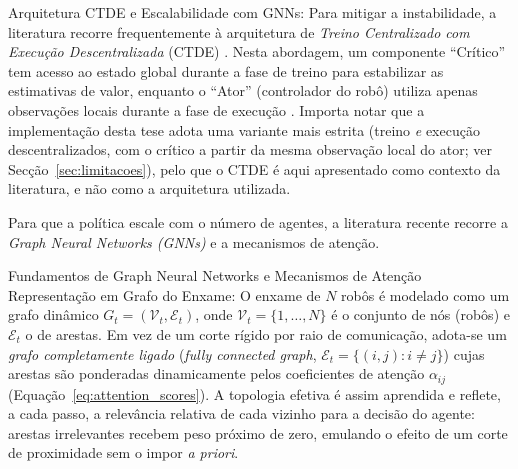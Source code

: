 \documentclass[12pt,reqno, twoside]{amsbook}
\makeatletter
\def\subsection{\@startsection{subsection}{2}%
      \z@{.5\linespacing\@plus.7\linespacing}{.25\linespacing}%
      {\normalfont\bfseries\flushleft}}
\def\paragraph{\@startsection{paragraph}{4}%
  \z@\z@{-\fontdimen2\font}%
  {\normalfont\bfseries}}
\theoremstyle{plain}
\numberwithin{equation}{chapter}
\numberwithin{section}{chapter}
\numberwithin{table}{chapter}
\numberwithin{figure}{chapter}
\makeatother
\begin{document}
\paragraph{Arquitetura CTDE e Escalabilidade com GNNs:} Para mitigar a instabilidade, a literatura recorre frequentemente à arquitetura de \emph{Treino Centralizado com Execução Descentralizada} (CTDE) \cite{lowe2017maddpg}. Nesta abordagem, um componente ``Crítico'' tem acesso ao estado global durante a fase de treino para estabilizar as estimativas de valor, enquanto o ``Ator'' (controlador do robô) utiliza apenas observações locais durante a fase de execução \cite{chen2024graph}. Importa notar que a implementação desta tese adota uma variante mais estrita (treino \emph{e} execução descentralizados, com o crítico a partir da mesma observação local do ator; ver Secção~\ref{sec:limitacoes}), pelo que o CTDE é aqui apresentado como contexto da literatura, e não como a arquitetura utilizada.

Para que a política escale com o número de agentes, a literatura recente recorre a \emph{Graph Neural Networks (GNNs)} e a mecanismos de atenção.

\subsection{Fundamentos de Graph Neural Networks e Mecanismos de Atenção}
\paragraph{Representação em Grafo do Enxame:}
O enxame de $N$ robôs é modelado como um grafo dinâmico $G_t = (\mathcal{V}_t, \mathcal{E}_t)$, onde $\mathcal{V}_t = \{1,\ldots,N\}$ é o conjunto de nós (robôs) e $\mathcal{E}_t$ o de arestas. Em vez de um corte rígido por raio de comunicação, adota-se um \emph{grafo completamente ligado} (\textit{fully connected graph}, $\mathcal{E}_t = \{(i,j) : i \neq j\}$) cujas arestas são ponderadas dinamicamente pelos coeficientes de atenção $\alpha_{ij}$ (Equação~\ref{eq:attention_scores}). A topologia efetiva é assim aprendida e reflete, a cada passo, a relevância relativa de cada vizinho para a decisão do agente: arestas irrelevantes recebem peso próximo de zero, emulando o efeito de um corte de proximidade sem o impor \textit{a priori}.
\end{document}
